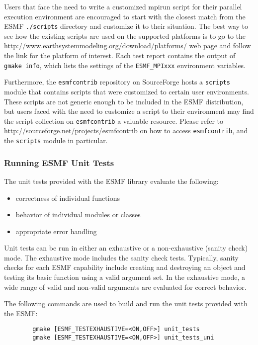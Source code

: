 Users that face the need to write a customized mpirun script for their
parallel execution environment are encouraged to start with the closest match 
from the ESMF {\tt ./scripts} directory and customize it to their situation.
The best way to see how the existing scripts are used on the supported
platforms is to go to the 
{http://www.earthsystemmodeling.org/download/platforms/} web page and follow the link 
for the platform of interest. Each test report contains the output of
{\tt gmake info}, which lists the settings of the {\tt ESMF\_MPIxxx} 
environment variables.

Furthermore, the {\tt esmfcontrib} repository on SourceForge hosts a 
{\tt scripts} module that contains scripts that were customized to certain
user environments. These scripts are not generic enough to be included in the
ESMF distribution, but users faced with the need to customize a script to their
environment may find the script collection on {\tt esmfcontrib} a valuable
resource. Please refer to
{http://sourceforge.net/projects/esmfcontrib} on how to access 
{\tt esmfcontrib}, and the {\tt scripts} module in particular.

\subsubsection{Running ESMF Unit Tests}

\label{UnitTestDescription}
The unit tests provided with the ESMF library evaluate the following:
\begin{itemize}
\item correctness of individual functions
\item behavior of individual modules or classes
\item appropriate error handling
\end{itemize}

Unit tests can be run in either an exhaustive or a non-exhaustive (sanity check)
mode.  The exhaustive mode includes the sanity check tests.  Typically, sanity
checks for each ESMF capability include creating and destroying an object and 
testing its basic function using a valid argument set.  In the exhaustive mode,
a wide range of valid and non-valid arguments are evaluated for correct behavior.

\label{RunUnitTests}

The following commands are used to build and run the unit tests provided with 
the ESMF:
\begin{verbatim}
        gmake [ESMF_TESTEXHAUSTIVE=<ON,OFF>] unit_tests
        gmake [ESMF_TESTEXHAUSTIVE=<ON,OFF>] unit_tests_uni
\end{verbatim}

